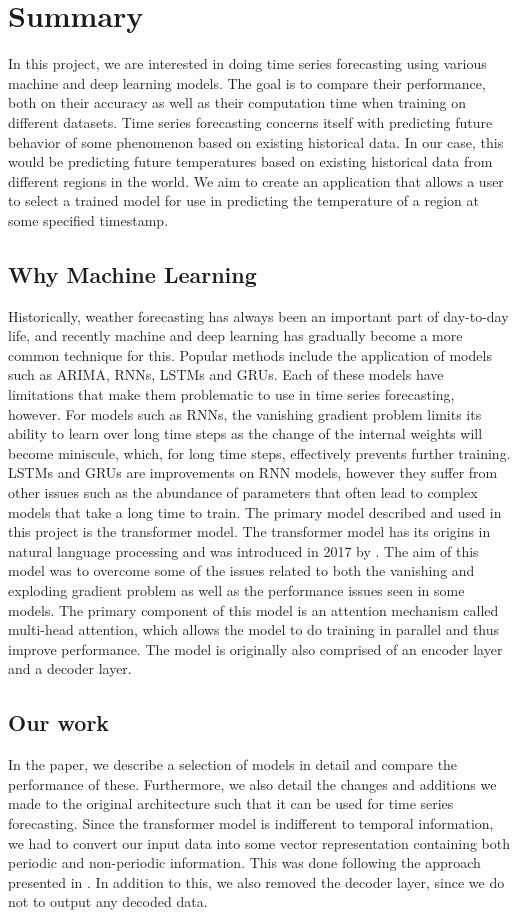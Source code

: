 \section*{Summary}
In this project, we are interested in doing time series forecasting using various machine and deep learning models.
The goal is to compare their performance, both on their accuracy as well as their computation time when training on different datasets.
Time series forecasting concerns itself with predicting future behavior of some phenomenon based on existing historical data.
In our case, this would be predicting future temperatures based on existing historical data from different regions in the world.
We aim to create an application that allows a user to select a trained model for use in predicting the temperature of a  region at some specified timestamp.

\subsection{Why Machine Learning}
Historically, weather forecasting has always been an important part of day-to-day life, and recently machine and deep learning has gradually become a more common technique for this.
Popular methods include the application of models such as ARIMA, RNNs, LSTMs and GRUs.
Each of these models have limitations that make them problematic to use in time series forecasting, however.
For models such as RNNs, the vanishing gradient problem limits its ability to learn over long time steps as the change of the internal weights will become miniscule, which, for long time steps, effectively prevents further training.
LSTMs and GRUs are improvements on RNN models, however they suffer from other issues such as the abundance of parameters that often lead to complex models that take a long time to train.
The primary model described and used in this project is the transformer model.
The transformer model has its origins in natural language processing and was introduced in 2017 by \citet{AttentionIsAllYouNeed}. 
The aim of this model was to overcome some of the issues related to both the vanishing and exploding gradient problem as well as the performance issues seen in some models.
The primary component of this model is an attention mechanism called multi-head attention, which allows the model to do training in parallel and thus improve performance. 
The model is originally also comprised of an encoder layer and a decoder layer. 

\subsection{Our work}
In the paper, we describe a selection of models in detail and compare the performance of these.
Furthermore, we also detail the changes and additions we made to the original architecture such that it can be used for time series forecasting.
Since the transformer model is indifferent to temporal information, we had to convert our input data into some vector representation containing both periodic and non-periodic information.
This was done following the approach presented in \citet{time2vec}.
In addition to this, we also removed the decoder layer, since we do not to output any decoded data.

